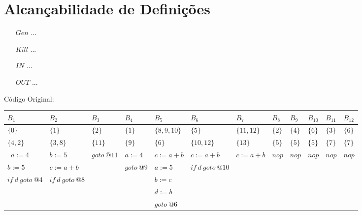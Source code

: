 \section{Alcan\c{c}abilidade de Defini\c{c}\~oes}

\begin{itemize}
  \item[$Gen$] ...
  \item[$Kill$] ...
  \item[$IN$] ...
  \item[$OUT$] ...
\end{itemize}

C\'odigo Original:

\begin{table}[ht]
\begin{scriptsize}
\begin{tabular}{l|l|l|l|l|l|l|l|l|l|l|l}
$B_{1}$ & $B_{2}$ & $B_{3}$ & $B_{4}$ & $B_{5}$ & $B_{6}$ & $B_{7}$ & $B_{8}$ & $B_{9}$ & $B_{10}$ & $B_{11}$ & $B_{12}$ \\
\hline
$\{0\}$ & $\{1\}$ & $\{2\}$ & $\{1\}$ & $\{8, 9, 10\}$ & $\{5\}$ & $\{11, 12\}$ & $\{2\}$ & $\{4\}$ & $\{6\}$ & $\{3\}$ & $\{6\}$ \\
$\{4, 2\}$ & $\{3, 8\}$ & $\{11\}$ & $\{9\}$ & $\{6\}$ & $\{10, 12\}$ & $\{13\}$ & $\{5\}$ & $\{5\}$ & $\{5\}$ & $\{7\}$ & $\{7\}$ \\
\hline\
$a:=4$ & $b:=5$ & $goto\:@11$ & $a:=4$ & $c:=a+b$ & $c:=a+b$ & $c:=a+b$ & $nop$ & $nop$ & $nop$ & $nop$ & $nop$ \\
$b:=5$ & $c:=a+b$ &  & $goto\:@9$ & $a:=5$ & $if\:d\:goto\:@10$ &  &  &  &  &  &  \\
$if\:d\:goto\:@4$ & $if\:d\:goto\:@8$ &  &  & $b:=c$ &  &  &  &  &  &  &  \\
 &  &  &  & $d:=b$ &  &  &  &  &  &  &  \\
 &  &  &  & $goto\:@6$ &  &  &  &  &  &  &  \\
\end{tabular}
\end{scriptsize}
\end{table}

